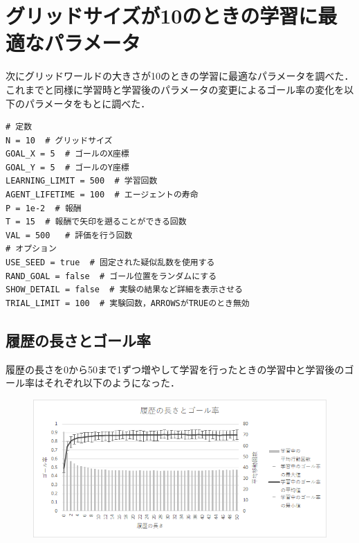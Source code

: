 \documentclass[a4j,11pt]{jarticle}
\begin{document}
\newpage

\section{グリッドサイズが10のときの学習に最適なパラメータ}

次にグリッドワールドの大きさが10のときの学習に最適なパラメータを調べた．これまでと同様に学習時と学習後のパラメータの変更によるゴール率の変化を以下のパラメータをもとに調べた．

\begin{verbatim}
# 定数
N = 10  # グリッドサイズ
GOAL_X = 5  # ゴールのX座標
GOAL_Y = 5  # ゴールのY座標
LEARNING_LIMIT = 500  # 学習回数
AGENT_LIFETIME = 100  # エージェントの寿命
P = 1e-2  # 報酬
T = 15  # 報酬で矢印を遡ることができる回数
VAL = 500   # 評価を行う回数
# オプション
USE_SEED = true  # 固定された疑似乱数を使用する
RAND_GOAL = false  # ゴール位置をランダムにする
SHOW_DETAIL = false  # 実験の結果など詳細を表示させる
TRIAL_LIMIT = 100  # 実験回数，ARROWSがTRUEのとき無効
\end{verbatim}

\newpage

\subsection{履歴の長さとゴール率}

履歴の長さを0から50まで1ずつ増やして学習を行ったときの学習中と学習後のゴール率はそれぞれ以下のようになった．

\begin{figure}[ht]
  \begin{center}
    \includegraphics[scale=1.5]{img/changeT10.png}
  \end{center}
\end{figure}
\end{document}

